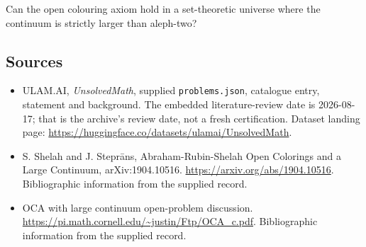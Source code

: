 \documentclass[11pt,a4paper]{article}
\begin{document}
Can the open colouring axiom hold in a set-theoretic universe where the continuum is strictly larger than aleph-two?

\subsection{Sources}

{\small

\begin{itemize}

\item[\hypertarget{source:statement:1}{S1}] ULAM.AI, \emph{UnsolvedMath}, supplied \texttt{problems.json}, catalogue entry, statement and background. The embedded literature-review date is 2026-08-17; that is the archive’s review date, not a fresh certification. Dataset landing page: \url{https://huggingface.co/datasets/ulamai/UnsolvedMath}.

\item[\hypertarget{source:statement:2}{S2}] S. Shelah and J. Steprāns, Abraham-Rubin-Shelah Open Colorings and a Large Continuum, arXiv:1904.10516. \url{https://arxiv.org/abs/1904.10516}. Bibliographic information from the supplied record.

\item[\hypertarget{source:statement:3}{S3}] OCA with large continuum open-problem discussion. \url{https://pi.math.cornell.edu/~justin/Ftp/OCA_c.pdf}. Bibliographic information from the supplied record.

\end{itemize}

}

\label{end:statement}
\end{document}
